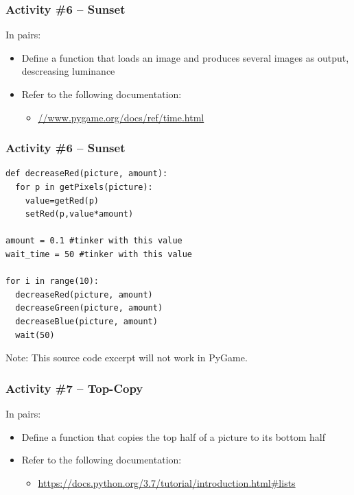 \begin{frame}
	\frametitle{Activity \#6 -- Sunset}
	
	In pairs:
	
	\vspace{2em}
	
	\begin{itemize}
		\item Define a function that loads an image and produces several images as output, descreasing luminance
		\item Refer to the following documentation:
		\begin{itemize}
			\item \url{//www.pygame.org/docs/ref/time.html}
		\end{itemize}
	\end{itemize}
\end{frame}

\begin{frame}[fragile]
	\frametitle{Activity \#6 -- Sunset}

\begin{lstlisting}
def decreaseRed(picture, amount):
  for p in getPixels(picture):
    value=getRed(p)
    setRed(p,value*amount)

amount = 0.1 #tinker with this value
wait_time = 50 #tinker with this value    
    
for i in range(10):
  decreaseRed(picture, amount)
  decreaseGreen(picture, amount)
  decreaseBlue(picture, amount)
  wait(50)
\end{lstlisting}

Note: This source code excerpt will not work in PyGame.

\end{frame}

\begin{frame}
	\frametitle{Activity \#7 -- Top-Copy}
	
	In pairs:
	
	\vspace{2em}
	
	\begin{itemize}
		\item Define a function that copies the top half of a picture to its bottom half
		\item Refer to the following documentation:
		\begin{itemize}
			\item \url{https://docs.python.org/3.7/tutorial/introduction.html\#lists}
		\end{itemize}
	\end{itemize}
\end{frame}

